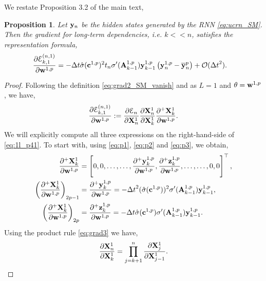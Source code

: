\documentclass{article}
\newtheorem{proposition}[theorem]{Proposition}
\newcommand{\by}{{\bf y}}
\newcommand{\bz}{{\bf z}}
\newcommand{\bw}{{\bf w}}
\newcommand{\bA}{{\bf A}}
\newcommand{\bX}{{\bf X}}
\newcommand{\bc}{{\bf c}}
\newcommand{\ord}{{\mathcal O}}
\newcommand{\Dt}{{\Delta t}}
\newcommand{\E}{\EuScript{E}}
\begin{document}
We restate Proposition 3.2 of the main text,
\begin{proposition}
\label{prop:4_SM}
Let $\by_n$ be the hidden states generated by the RNN \eqref{eq:ucrn_SM}. Then the gradient for long-term dependencies, i.e. $k << n$, satisfies the representation formula,
\begin{equation}
     \label{eq:glb_SM}
     \begin{aligned}
      \frac{\partial \E^{(n,1)}_{k,1}}{\partial \bw^{1,p}} &=
      -\Dt\hat{\sigma}(\bc^{1,p})^2t_n\sigma^{\prime}(\bA^{1,p}_{k-1})\by^{1,p}_{k-1}\left(\by^{1,p}_n-\overline{\by}^p_n\right) + \ord(\Dt^2).
     \end{aligned}
 \end{equation}
\end{proposition}
\begin{proof}
Following the definition \eqref{eq:grad2_SM_vanish} and as $L=1$ and $\theta = \bw^{1,p}$, we have,
\begin{equation}
    \label{eq:1l_p41}
    \frac{\partial \E^{(n,1)}_{k,1}}{\partial \bw^{1,p}} := \frac{\partial \E_n}{\partial \bX^1_n} \frac{\partial \bX^1_n}{\partial \bX^1_k} \frac{\partial^{+} \bX^1_k}{\partial \bw^{1,p}}.
\end{equation}
We will explicitly compute all three expressions on the right-hand-side of \eqref{eq:1l_p41}. To start with, using \eqref{eq:p1}, \eqref{eq:p2} and \eqref{eq:p3}, we obtain,
\begin{equation}
    \label{eq:p42}
    \begin{aligned}
    \frac{\partial^+\bX^1_k}{\partial \bw^{1,p}} &= \left[
0,0,\ldots,
\ldots,\frac{\partial^+\by^{1,p}_k}{\partial \bw^{1,p}},\frac{\partial^+\bz^{1,p}_k}{\partial \bw^{1,p}},\ldots,\ldots,0,0\right]^\top, \\
\left(\frac{\partial^+\bX^1_k}{\partial \bw^{1,p}}\right)_{2p-1} &=\frac{\partial^+\by^{1,p}_k}{\partial \bw^{1,p}} = -\Dt^2(\hat{\sigma}(\bc^{1,p}))^2\sigma^{\prime}(\bA^{1,p}_{k-1})\by^{1,p}_{k-1},  \\
\left(\frac{\partial^+\bX^1_k}{\partial \bw^{1,p}}\right)_{2p} &=\frac{\partial^+\bz^{1,p}_k}{\partial \bw^{1,p}} = -\Dt\hat{\sigma}(\bc^{1,p})\sigma^{\prime}(\bA^{1,p}_{k-1})\by^{1,p}_{k-1}.
\end{aligned}
\end{equation}
Using the product rule \eqref{eq:grad3} we have,
\begin{equation}
\label{eq:l1_p43}
 \frac{\partial \bX^1_n}{\partial \bX^1_k} = \prod\limits_{j=k+1}^n  \frac{\partial \bX^1_j}{\partial \bX^1_{j-1}}. 

\end{equation}
\end{proof}
\end{document}
